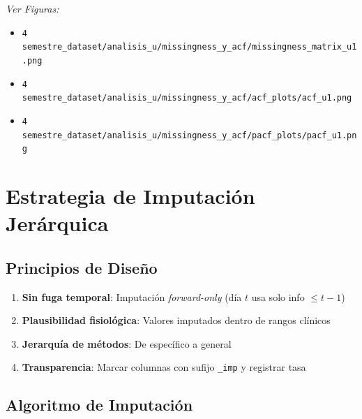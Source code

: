 \documentclass[12pt,letterpaper,twoside]{report}
\begin{document}
\textit{Ver Figuras:}
\begin{itemize}[noitemsep]
    \item \texttt{4 semestre\_dataset/analisis\_u/missingness\_y\_acf/missingness\_matrix\_u1.png}
    \item \texttt{4 semestre\_dataset/analisis\_u/missingness\_y\_acf/acf\_plots/acf\_u1.png}
    \item \texttt{4 semestre\_dataset/analisis\_u/missingness\_y\_acf/pacf\_plots/pacf\_u1.png}
\end{itemize}

\section{Estrategia de Imputación Jerárquica}

\subsection{Principios de Diseño}

\begin{enumerate}[noitemsep]
    \item \textbf{Sin fuga temporal}: Imputación \textit{forward-only} (día $t$ usa solo info $\leq t-1$)
    \item \textbf{Plausibilidad fisiológica}: Valores imputados dentro de rangos clínicos
    \item \textbf{Jerarquía de métodos}: De específico a general
    \item \textbf{Transparencia}: Marcar columnas con sufijo \texttt{\_imp} y registrar tasa
\end{enumerate}

\subsection{Algoritmo de Imputación}
\end{document}
